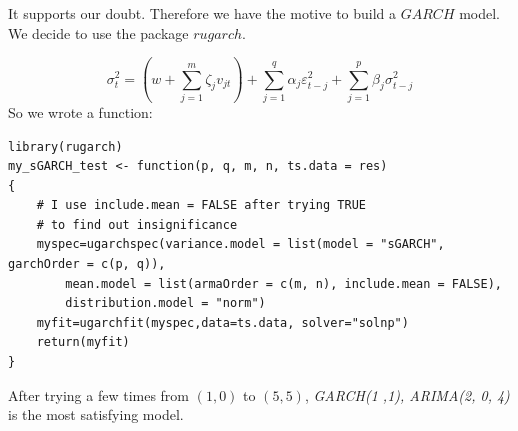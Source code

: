 \documentclass[a4paper, 11pt]{article}
\begin{document}
\indent It supports our doubt. Therefore we have the motive to build a $GARCH$ model. We decide to use the package $rugarch$.\par
\begin{equation*}
	\sigma_t^2 = (w + \sum_{j = 1}^m \zeta_j v_{jt}) + \sum_{j = 1}^q \alpha_j \varepsilon_{t-j}^2 + \sum_{j = 1}^p \beta_j \sigma_{t-j}^2
\end{equation*} 
\indent So we wrote a function:
\begin{verbatim}
library(rugarch)
my_sGARCH_test <- function(p, q, m, n, ts.data = res)
{
	# I use include.mean = FALSE after trying TRUE
	# to find out insignificance
    myspec=ugarchspec(variance.model = list(model = "sGARCH", garchOrder = c(p, q)), 
    	mean.model = list(armaOrder = c(m, n), include.mean = FALSE), 
    	distribution.model = "norm")
    myfit=ugarchfit(myspec,data=ts.data, solver="solnp")
    return(myfit)  
}
\end{verbatim}
\indent After trying a few times from $(1, 0)$ to $(5, 5)$, \textit{GARCH(1 ,1), ARIMA(2, 0, 4)} is the most satisfying model.
\end{document}
